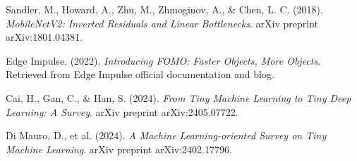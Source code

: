 \documentclass{article}
\begin{document}
\begin{thebibliography}{9}

Sandler, M., Howard, A., Zhu, M., Zhmoginov, A., \& Chen, L. C. (2018).
\textit{MobileNetV2: Inverted Residuals and Linear Bottlenecks}.
arXiv preprint arXiv:1801.04381.

Edge Impulse. (2022).
\textit{Introducing FOMO: Faster Objects, More Objects}.
Retrieved from Edge Impulse official documentation and blog.

Cai, H., Gan, C., \& Han, S. (2024).
\textit{From Tiny Machine Learning to Tiny Deep Learning: A Survey}.
arXiv preprint arXiv:2405.07722.

Di Mauro, D., et al. (2024).
\textit{A Machine Learning-oriented Survey on Tiny Machine Learning}.
arXiv preprint arXiv:2402.17796.

\end{thebibliography}
\end{document}
